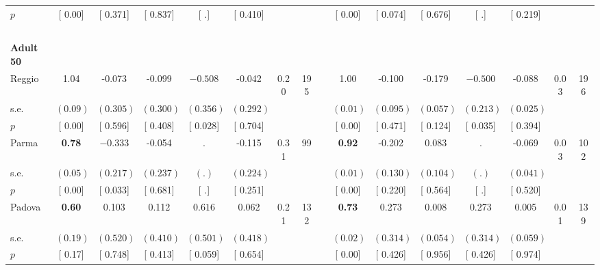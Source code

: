 \begin{longtable}{L{8em} c c c c c c c p{1em} c c c c c c c}
\quad \quad \quad \quad $ p$ & [     0.00] & [    0.371] & [    0.837] & [        .] & [    0.410] & & & & [     0.00] & [    0.074] & [    0.676] & [        .] & [    0.219] & &  \\[1em]
~\\[1em]
\quad \quad \textbf{Adult 50} & & & & & & & & & & & & & & & \\* 
\quad \quad \quad Reggio& 1.04 &    -0.073 &    -0.099 & $ \mathbf{   -0.508}$ &    -0.042 &      0.20 &       195 & & 1.00 &    -0.100 &    -0.179 & $ \mathbf{   -0.500}$ &    -0.088 &      0.03 &       196  \\*
\quad \quad \quad \quad s.e.& $ (     0.09)$ & $ (    0.305)$ & $ (    0.300)$ & $ (    0.356)$ & $ (    0.292)$ & & & & $ (     0.01)$ & $ (    0.095)$ & $ (    0.057)$ & $ (    0.213)$ & $ (    0.025)$ & &  \\*
\quad \quad \quad \quad $ p$ & [     0.00] & [    0.596] & [    0.408] & [    0.028] & [    0.704] & & & & [     0.00] & [    0.471] & [    0.124] & [    0.035] & [    0.394] & &  \\[1em]
\quad \quad \quad Parma& \textbf{     0.78} & $ \mathbf{   -0.333}$ &    -0.054 &         . &    -0.115 &      0.31 &        99 & & \textbf{     0.92} &    -0.202 &     0.083 &         . &    -0.069 &      0.03 &       102  \\*
\quad \quad \quad \quad s.e.& $ (     0.05)$ & $ (    0.217)$ & $ (    0.237)$ & $ (        .)$ & $ (    0.224)$ & & & & $ (     0.01)$ & $ (    0.130)$ & $ (    0.104)$ & $ (        .)$ & $ (    0.041)$ & &  \\*
\quad \quad \quad \quad $ p$ & [     0.00] & [    0.033] & [    0.681] & [        .] & [    0.251] & & & & [     0.00] & [    0.220] & [    0.564] & [        .] & [    0.520] & &  \\[1em]
\quad \quad \quad Padova& \textbf{     0.60} &     0.103 &     0.112 & $ \mathbf{    0.616}$ &     0.062 &      0.21 &       132 & & \textbf{     0.73} &     0.273 &     0.008 &     0.273 &     0.005 &      0.01 &       139  \\*
\quad \quad \quad \quad s.e.& $ (     0.19)$ & $ (    0.520)$ & $ (    0.410)$ & $ (    0.501)$ & $ (    0.418)$ & & & & $ (     0.02)$ & $ (    0.314)$ & $ (    0.054)$ & $ (    0.314)$ & $ (    0.059)$ & &  \\*
\quad \quad \quad \quad $ p$ & [     0.17] & [    0.748] & [    0.413] & [    0.059] & [    0.654] & & & & [     0.00] & [    0.426] & [    0.956] & [    0.426] & [    0.974] & &  \\[1em]

\end{longtable}
